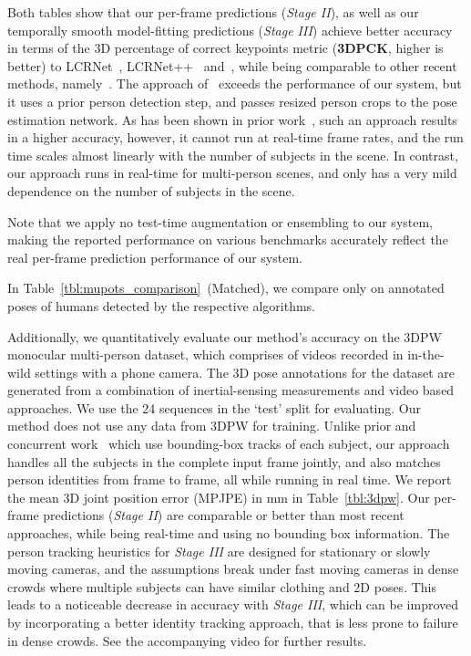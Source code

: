 \documentclass[acmtog,authorversion]{acmart}
\newcommand{\change}[1]{{{#1}}}
\begin{document}
Both tables show that our per-frame predictions (\textit{Stage II}), as well as our temporally smooth model-fitting predictions (\textit{Stage III}) achieve better accuracy in terms of the 3D percentage of correct keypoints metric (\textbf{3DPCK}, higher is better) to LCRNet~, LCRNet++~ and~\cite{mehta_3dv18}, while being comparable to other recent methods, namely~\cite{dabral2019multi}. The approach of~\citet{Moon_2019_ICCV_3DMPPE} exceeds the performance of our system, but it uses a prior person detection step, and passes resized person crops to the pose estimation network. As has been shown in prior work~\citep{cao_affinity_2017}, such an approach results in a higher accuracy, however, it cannot run at real-time frame rates, and the run time scales almost linearly with the number of subjects in the scene. In contrast, our approach runs in real-time for multi-person scenes, and only has a very mild dependence on the number of subjects in the scene.

Note that we apply no test-time augmentation or ensembling to our system, making the reported performance on various benchmarks accurately reflect the real per-frame prediction performance of our system.

In Table~\ref{tbl:mupots_comparison}~(Matched), we compare only on annotated poses of humans detected by the respective algorithms. 

\change{Additionally, we quantitatively evaluate our method's accuracy on the 3DPW~\cite{vonMarcard2018} monocular multi-person dataset, which comprises of videos recorded in in-the-wild settings with a phone camera. The 3D pose annotations for the dataset are generated from a combination of inertial-sensing measurements and video based approaches. We use the 24 sequences in the `test' split for evaluating. Our method does not use any data from 3DPW for training.
Unlike prior and concurrent work~\cite{humanMotionKanazawa19,kanazawa2018endtoend,kocabas2019vibe} which use bounding-box tracks of each subject, our approach handles all the subjects in the complete input frame jointly, and also matches person identities from frame to frame, all while running in real time. 
We report the mean 3D joint position error (MPJPE) in mm in Table~\ref{tbl:3dpw}. Our per-frame predictions (\textit{Stage II}) are comparable or better than most recent approaches, while being real-time and using no bounding box information. The person tracking heuristics for \textit{Stage III} are designed for stationary or slowly moving cameras, and the assumptions break under fast moving cameras in dense crowds where multiple subjects can have similar clothing and 2D poses. This leads to a noticeable decrease in accuracy with \textit{Stage III}, which can be improved by incorporating a better identity tracking approach, that is less prone to failure in dense crowds.
See the accompanying video for further results. 
}
\end{document}
